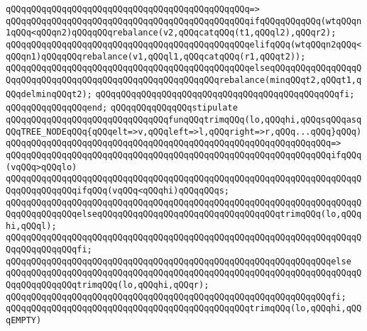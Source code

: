 \verb|qQQqqQQqqQQqqQQqqQQqqQQqqQQqqQQqqQQqqQQqqQQqqQQq=>|\newline
\verb|qQQqqQQqqQQqqQQqqQQqqQQqqQQqqQQqqQQqqQQqqQQqqQQqifqQQqqQQqqQQq(wtqQQqn1qQQq<qQQqn2)qQQqqQQqrebalance(v2,qQQqcatqQQq(t1,qQQql2),qQQqr2);|\newline
\verb|qQQqqQQqqQQqqQQqqQQqqQQqqQQqqQQqqQQqqQQqqQQqqQQqelifqQQq(wtqQQqn2qQQq<qQQqn1)qQQqqQQqrebalance(v1,qQQql1,qQQqcatqQQq(r1,qQQqt2));|\newline
\verb|qQQqqQQqqQQqqQQqqQQqqQQqqQQqqQQqqQQqqQQqqQQqqQQqelseqQQqqQQqqQQqqQQqqQQqqQQqqQQqqQQqqQQqqQQqqQQqqQQqqQQqqQQqqQQqrebalance(minqQQqt2,qQQqt1,qQQqdelminqQQqt2);|\newline
\verb|qQQqqQQqqQQqqQQqqQQqqQQqqQQqqQQqqQQqqQQqqQQqqQQqfi;|\newline
\verb|qQQqqQQqqQQqqQQqend;|\newline
\newline
\newline
\verb|qQQqqQQqqQQqqQQqstipulate|\newline
\newline
\verb|qQQqqQQqqQQqqQQqqQQqqQQqqQQqqQQqfunqQQqtrimqQQq(lo,qQQqhi,qQQqsqQQqasqQQqTREE_NODEqQQq{qQQqelt=>v,qQQqleft=>l,qQQqright=>r,qQQq...qQQq}qQQq)|\newline
\verb|qQQqqQQqqQQqqQQqqQQqqQQqqQQqqQQqqQQqqQQqqQQqqQQqqQQqqQQqqQQqqQQq=>|\newline
\verb|qQQqqQQqqQQqqQQqqQQqqQQqqQQqqQQqqQQqqQQqqQQqqQQqqQQqqQQqqQQqqQQqifqQQq(vqQQq>qQQqlo)|\newline
\verb|qQQqqQQqqQQqqQQqqQQqqQQqqQQqqQQqqQQqqQQqqQQqqQQqqQQqqQQqqQQqqQQqqQQqqQQqqQQqqQQqqQQqifqQQq(vqQQq<qQQqhi)qQQqqQQqs;|\newline
\verb|qQQqqQQqqQQqqQQqqQQqqQQqqQQqqQQqqQQqqQQqqQQqqQQqqQQqqQQqqQQqqQQqqQQqqQQqqQQqqQQqqQQqelseqQQqqQQqqQQqqQQqqQQqqQQqqQQqqQQqqQQqtrimqQQq(lo,qQQqhi,qQQql);|\newline
\verb|qQQqqQQqqQQqqQQqqQQqqQQqqQQqqQQqqQQqqQQqqQQqqQQqqQQqqQQqqQQqqQQqqQQqqQQqqQQqqQQqqQQqfi;|\newline
\verb|qQQqqQQqqQQqqQQqqQQqqQQqqQQqqQQqqQQqqQQqqQQqqQQqqQQqqQQqqQQqqQQqelse|\newline
\verb|qQQqqQQqqQQqqQQqqQQqqQQqqQQqqQQqqQQqqQQqqQQqqQQqqQQqqQQqqQQqqQQqqQQqqQQqqQQqqQQqqQQqtrimqQQq(lo,qQQqhi,qQQqr);|\newline
\verb|qQQqqQQqqQQqqQQqqQQqqQQqqQQqqQQqqQQqqQQqqQQqqQQqqQQqqQQqqQQqqQQqfi;|\newline
\newline
\verb|qQQqqQQqqQQqqQQqqQQqqQQqqQQqqQQqqQQqqQQqqQQqqQQqtrimqQQq(lo,qQQqhi,qQQqEMPTY)|\newline
